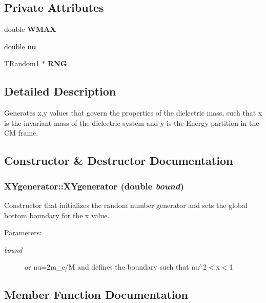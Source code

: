 \subsection*{Private Attributes}
\begin{CompactItemize}
\item 
double \bf{WMAX}
\item 
double \bf{nu}
\item 
TRandom1 $\ast$ \bf{RNG}
\end{CompactItemize}


\subsection{Detailed Description}
Generates x,y values that govern the properties of the dielectric mass, such that x is the invariant mass of the dielectric system and y is the Energy partition in the CM frame. 



\subsection{Constructor \& Destructor Documentation}
\subsubsection{\setlength{\rightskip}{0pt plus 5cm}XYgenerator::XYgenerator (double {\em bound})}\label{classXYgenerator_139ceb16714a96ac93bc8559663c3f63}


Constructor that initializes the random number generator and sets the global bottom boundary for the x value. 

\begin{Desc}
\item[Parameters:]
\begin{description}
\item[{\em bound}]or nu=2m\_\-e/M and defines the boundary such that nu$^\wedge$2$<$x$<$1 \end{description}
\end{Desc}


\subsection{Member Function Documentation}
